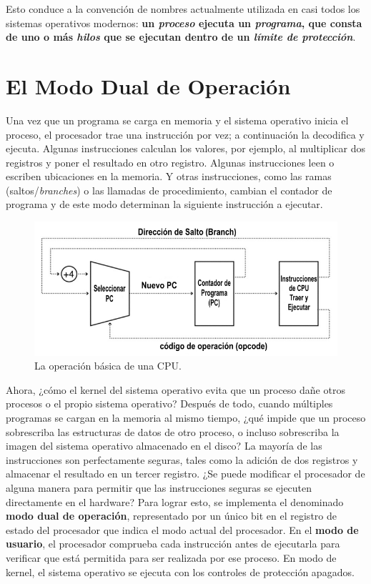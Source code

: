 \documentclass[10pt]{book}
\begin{document}
Esto conduce a la convención de nombres actualmente utilizada en casi todos los sistemas operativos modernos: \textbf{un \textit{proceso} ejecuta un \textit{programa}, que consta de uno o más \textit{hilos} que se ejecutan dentro de un \textit{límite de protección}}.


\section{El Modo Dual de Operación}
Una vez que un programa se carga en memoria y el sistema operativo inicia el proceso, el procesador trae una instrucción por vez; a continuación la decodifica y ejecuta. Algunas instrucciones calculan los valores, por ejemplo, al multiplicar dos registros y poner el resultado en otro registro. Algunas instrucciones leen o escriben ubicaciones en la memoria. Y otras instrucciones, como las ramas (saltos/\textit{branches}) o las llamadas de procedimiento, cambian el contador de programa y de este modo determinan la siguiente instrucción a ejecutar.

\begin{figure}[tbhp]
\centerline{\includegraphics[scale=0.70]{img/fig02}}
\caption{La operación básica de una CPU.}
\label{fig02}
\end{figure}

Ahora, ¿cómo el kernel del sistema operativo evita que un proceso dañe otros procesos o el propio sistema operativo? Después de todo, cuando múltiples programas se cargan en la memoria al mismo tiempo, ¿qué impide que un proceso sobrescriba las estructuras de datos de otro proceso, o incluso sobrescriba la imagen del sistema operativo almacenado en el disco? La mayoría de las instrucciones son perfectamente seguras, tales como la adición de dos registros y almacenar el resultado en un tercer registro. ¿Se puede modificar el procesador de alguna manera para permitir que las instrucciones seguras se ejecuten directamente en el hardware? Para lograr esto, se implementa el denominado \textbf{modo dual de operación}, representado por un único bit en el registro de estado del procesador que indica el modo actual del procesador. En el \textbf{modo de usuario}, el procesador comprueba cada instrucción antes de ejecutarla para verificar que está permitida para ser realizada por ese proceso. En modo de kernel, el sistema operativo se ejecuta con los controles de protección apagados.
\end{document}
